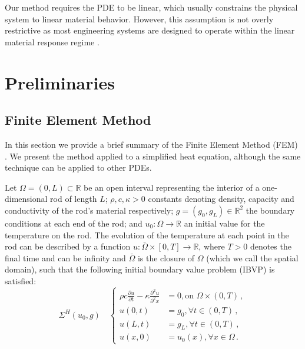 \documentclass[letterpaper, 10 pt, conference]{ieeeconf/ieeeconf}
\newcommand*{\R}{\mathbb{R}}
\begin{document}
Our method requires the PDE to be linear, which usually constrains the
physical system to linear material behavior. However, this assumption is
not overly restrictive as most engineering systems are designed to operate
within the linear material response regime \cite{}.

\section{Preliminaries}
\label{sec:preliminaries}

\subsection{Finite Element Method}
\label{sec:heat_equation_and_finite_element_analysis}

In this section we provide a brief summary of the Finite Element Method (FEM)
\cite{hughes_finite_2000}.
We present the method applied
to a simplified heat equation, although the same technique can be applied to other
PDEs. 

Let $\Omega = (0, L) \subset \R$ be an open interval representing the interior
of a one-dimensional rod of length $L$; $\rho, c, \kappa > 0$ 
constants denoting density, capacity and conductivity of the rod's material respectively;
$g = (g_0, g_L) \in \R^2$ the boundary conditions at each end of the rod; and $u_0 :
\Omega \rightarrow \R$ an initial value for the temperature on the rod. 
The evolution of the temperature at
each point in the rod can be described by a function $u : \bar \Omega \times [0,
T] \rightarrow \R$, where $T > 0$ denotes the final time and can be infinity and
$\bar \Omega$ is the closure of $\Omega$ (which we call the spatial domain),
such that the following initial boundary value problem (IBVP) is satisfied:
%
\begin{equation}\label{eq:pde}
    \Sigma^{H}(u_0, g) \quad \left \{
    \begin{aligned}
        \rho c \frac{\partial u}{\partial t} - \kappa \frac{\partial^2
        u}{\partial^2 x} &= 0, \text{on } \Omega \times (0, T) \,, \\
        u(0, t) &= g_0, \forall t \in (0, T) \,, \\
        u(L, t) &= g_L, \forall t \in (0, T) \,, \\
        u(x, 0) &= u_0(x), \forall x \in \Omega \,.
    \end{aligned}
    \right.
\end{equation}
\end{document}
